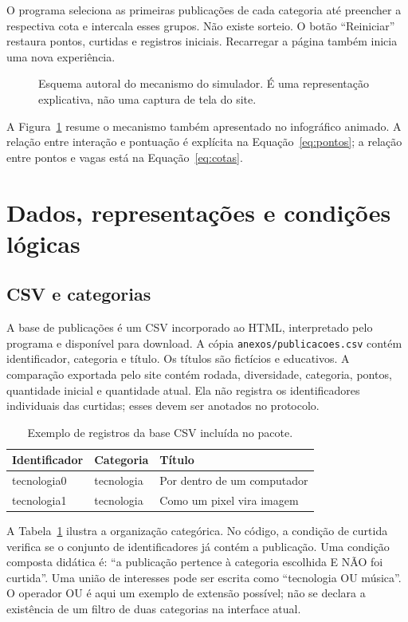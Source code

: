 \documentclass[12pt,a4paper]{article}
\begin{document}
O programa seleciona as primeiras publicações de cada categoria até preencher a respectiva cota e intercala esses grupos. Não existe sorteio. O botão ``Reiniciar'' restaura pontos, curtidas e registros iniciais. Recarregar a página também inicia uma nova experiência.
\begin{figure}[htbp]
\centering
{}
\caption{Esquema autoral do mecanismo do simulador. É uma representação explicativa, não uma captura de tela do site.}\label{fig:ciclo}
\end{figure}
A Figura~\ref{fig:ciclo} resume o mecanismo também apresentado no infográfico animado. A relação entre interação e pontuação é explícita na Equação~\ref{eq:pontos}; a relação entre pontos e vagas está na Equação~\ref{eq:cotas}.
\section{Dados, representações e condições lógicas}
\subsection{CSV e categorias}
A base de publicações é um CSV incorporado ao HTML, interpretado pelo programa e disponível para download. A cópia \texttt{anexos/publicacoes.csv} contém identificador, categoria e título. Os títulos são fictícios e educativos. A comparação exportada pelo site contém rodada, diversidade, categoria, pontos, quantidade inicial e quantidade atual. Ela não registra os identificadores individuais das curtidas; esses devem ser anotados no protocolo.
\begin{table}[htbp]\centering\small
\begin{tabular}{lll}\toprule Identificador & Categoria & Título\\\midrule
tecnologia0 & tecnologia & Por dentro de um computador\\
tecnologia1 & tecnologia & Como um pixel vira imagem\\\bottomrule
\end{tabular}
\caption{Exemplo de registros da base CSV incluída no pacote.}\label{tab:csv}
\end{table}
A Tabela~\ref{tab:csv} ilustra a organização categórica. No código, a condição de curtida verifica se o conjunto de identificadores já contém a publicação. Uma condição composta didática é: ``a publicação pertence à categoria escolhida E NÃO foi curtida''. Uma união de interesses pode ser escrita como ``tecnologia OU música''. O operador OU é aqui um exemplo de extensão possível; não se declara a existência de um filtro de duas categorias na interface atual.
\end{document}
